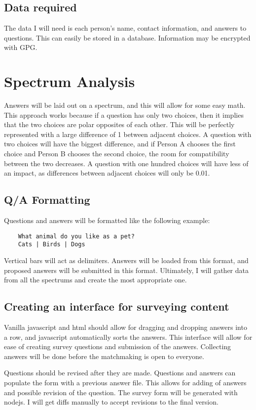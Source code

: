 \documentclass[12pt]{article}
\begin{document}
\subsection{Data required}
The data I will need is each person's name, contact information, and answers to
questions. This can easily be stored in a database. Information may be encrypted
with GPG.

\section{Spectrum Analysis}
Answers will be laid out on a spectrum, and this will allow for some easy math.
This approach works because if a question has only two choices, then it implies
that the two choices are polar opposites of each other. This will be perfectly
represented with a large difference of 1 between adjacent choices. A question
with two choices will have the biggest difference, and if Person A chooses the
first choice and Person B chooses the second choice, the room for compatibility
between the two decreases. A question with one hundred choices will have less
of an impact, as differences between adjacent choices will only be 0.01.

\subsection{Q/A Formatting}
Questions and answers will be formatted like the following example:

\begin{verbatim}
    What animal do you like as a pet?
    Cats | Birds | Dogs
\end{verbatim}

Vertical bars will act as delimiters. Answers will be loaded from this format,
and proposed answers will be submitted in this format. Ultimately, I will gather
data from all the spectrums and create the most appropriate one.

\subsection{Creating an interface for surveying content}
Vanilla javascript and html should allow for dragging and dropping answers into
a row, and javascript automatically sorts the answers. This interface will
allow for ease of creating survey questions and submission of the answers.
Collecting answers will be done before the matchmaking is open to everyone.

Questions should be revised after they are made. Questions and answers can
populate the form with a previous answer file. This allows for adding of
answers and possible revision of the question. The survey form will be
generated with nodejs. I will get diffs manually to accept revisions to the
final version.
\end{document}
